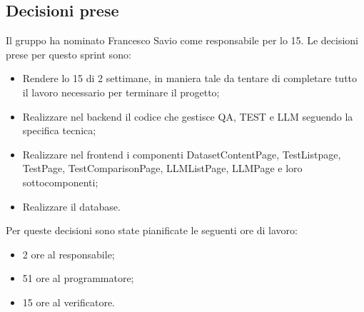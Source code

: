 \documentclass[a4paper, 12pt]{article}
\begin{document}
\subsection{Decisioni prese}
    Il gruppo ha nominato Francesco Savio come responsabile per lo  15.
    Le decisioni prese per questo sprint sono:
    \begin{itemize}
        \item Rendere lo  15 di 2 settimane, in maniera tale da tentare di completare tutto il lavoro necessario per terminare il progetto;
        \item Realizzare nel backend il codice che gestisce QA, TEST e LLM seguendo la specifica tecnica;
        \item Realizzare nel frontend i componenti DatasetContentPage, TestListpage, TestPage, TestComparisonPage, LLMListPage, LLMPage e loro sottocomponenti;
        \item Realizzare il database.
    \end{itemize}
    Per queste decisioni sono state pianificate le seguenti ore di lavoro:
    \begin{itemize}  
        \item 2 ore al responsabile;
        \item 51 ore al programmatore;
        \item 15 ore al verificatore.
    \end{itemize}
\end{document}
